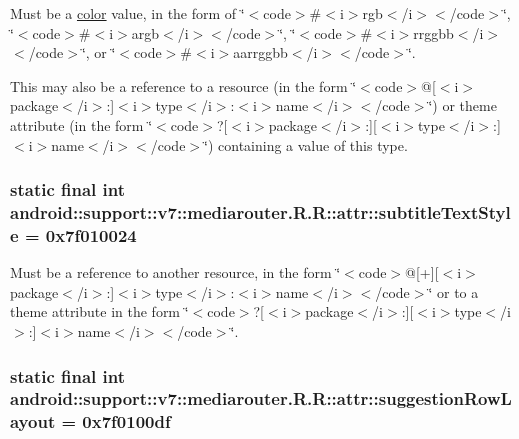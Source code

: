 Must be a \hyperlink{classandroid_1_1support_1_1v7_1_1mediarouter_1_1_r_1_1color}{color} value, in the form of \char`\"{}$<$code$>$\#$<$i$>$rgb$<$/i$>$$<$/code$>$\char`\"{}, \char`\"{}$<$code$>$\#$<$i$>$argb$<$/i$>$$<$/code$>$\char`\"{}, \char`\"{}$<$code$>$\#$<$i$>$rrggbb$<$/i$>$$<$/code$>$\char`\"{}, or \char`\"{}$<$code$>$\#$<$i$>$aarrggbb$<$/i$>$$<$/code$>$\char`\"{}. 

This may also be a reference to a resource (in the form \char`\"{}$<$code$>$@\mbox{[}$<$i$>$package$<$/i$>$:\mbox{]}$<$i$>$type$<$/i$>$:$<$i$>$name$<$/i$>$$<$/code$>$\char`\"{}) or theme attribute (in the form \char`\"{}$<$code$>$?\mbox{[}$<$i$>$package$<$/i$>$:\mbox{]}\mbox{[}$<$i$>$type$<$/i$>$:\mbox{]}$<$i$>$name$<$/i$>$$<$/code$>$\char`\"{}) containing a value of this type. \hypertarget{classandroid_1_1support_1_1v7_1_1mediarouter_1_1_r_1_1attr_675e916c717e33f17a4600c2d6b76582}{
\subsubsection[{subtitleTextStyle}]{\setlength{\rightskip}{0pt plus 5cm}static final int android::support::v7::mediarouter.R.R::attr::subtitleTextStyle = 0x7f010024}}
\label{classandroid_1_1support_1_1v7_1_1mediarouter_1_1_r_1_1attr_675e916c717e33f17a4600c2d6b76582}


Must be a reference to another resource, in the form \char`\"{}$<$code$>$@\mbox{[}+\mbox{]}\mbox{[}$<$i$>$package$<$/i$>$:\mbox{]}$<$i$>$type$<$/i$>$:$<$i$>$name$<$/i$>$$<$/code$>$\char`\"{} or to a theme attribute in the form \char`\"{}$<$code$>$?\mbox{[}$<$i$>$package$<$/i$>$:\mbox{]}\mbox{[}$<$i$>$type$<$/i$>$:\mbox{]}$<$i$>$name$<$/i$>$$<$/code$>$\char`\"{}. \hypertarget{classandroid_1_1support_1_1v7_1_1mediarouter_1_1_r_1_1attr_49318af342d1d513b79017edbcbe17c9}{
\subsubsection[{suggestionRowLayout}]{\setlength{\rightskip}{0pt plus 5cm}static final int android::support::v7::mediarouter.R.R::attr::suggestionRowLayout = 0x7f0100df}}
\label{classandroid_1_1support_1_1v7_1_1mediarouter_1_1_r_1_1attr_49318af342d1d513b79017edbcbe17c9}


